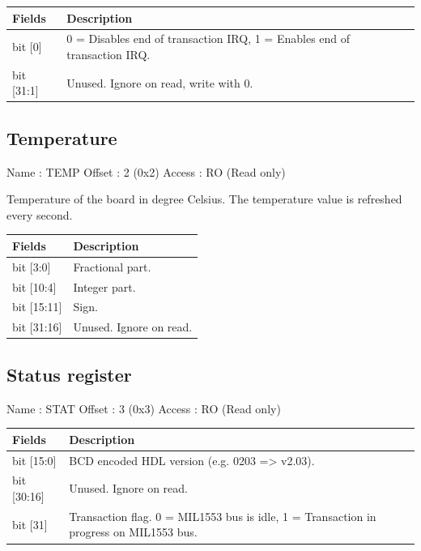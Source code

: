 \documentclass[11pt,a4paper]{article}
\begin{document}
\begin{table}[h!]
  \begin{tabularx}{\textwidth}{ l X }
    \hline
    \textbf{Fields} & \textbf{Description}\\
    \hline
    bit [0]     & 0 = Disables end of transaction IRQ, 1 = Enables end of transaction IRQ. \\
    bit [31:1]  & Unused. Ignore on read, write with 0. \\
    \hline
  \end{tabularx}
\end{table}

\subsection{Temperature}

Name   : TEMP \newline
Offset : 2 (0x2) \newline
Access : RO (Read only) \newline

Temperature of the board in degree Celsius.
The temperature value is refreshed every second.

\begin{table}[h!]
  \begin{tabularx}{\textwidth}{ l X }
    \hline
    \textbf{Fields} & \textbf{Description}\\
    \hline
    bit [3:0]   & Fractional part. \\
    bit [10:4]  & Integer part. \\
    bit [15:11] & Sign. \\
    bit [31:16] & Unused. Ignore on read. \\
    \hline
  \end{tabularx}
\end{table}

\subsection{Status register}

Name   : STAT \newline
Offset : 3 (0x3) \newline
Access : RO (Read only) \newline

\begin{table}[h!]
  \begin{tabularx}{\textwidth}{ l X }
    \hline
    \textbf{Fields} & \textbf{Description}\\
    \hline
    bit [15:0]  & BCD encoded HDL version (e.g. 0203 => v2.03). \\
    bit [30:16] & Unused. Ignore on read. \\
    bit [31]    & Transaction flag.
                  0 = MIL1553 bus is idle,
                  1 = Transaction in progress on MIL1553 bus. \\
    \hline
  \end{tabularx}
\end{table}
\end{document}
